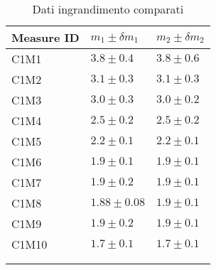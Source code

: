 \begin{longtable}[]{@{}lll@{}}
    \toprule
    Measure ID & $m_1 \pm \delta m_1$ & $m_2 \pm \delta m_2$ \tabularnewline
    \midrule
    \endhead
    C1M1 & $3.8 \pm 0.4$ & $3.8 \pm 0.6$ \tabularnewline
    C1M2 & $3.1 \pm 0.3$ & $3.1 \pm 0.3$ \tabularnewline
    C1M3 & $3.0 \pm 0.3$ & $3.0 \pm 0.2$ \tabularnewline
    C1M4 & $2.5 \pm 0.2$ & $2.5 \pm 0.2$ \tabularnewline
    C1M5 & $2.2 \pm 0.1$ & $2.2 \pm 0.1$ \tabularnewline
    C1M6 & $1.9 \pm 0.1$ & $1.9 \pm 0.1$ \tabularnewline
    C1M7 & $1.9 \pm 0.2$ & $1.9 \pm 0.1$ \tabularnewline
    C1M8 & $1.88\pm 0.08$& $1.9 \pm 0.1$ \tabularnewline
    C1M9 & $1.9 \pm 0.2$ & $1.9 \pm 0.1$ \tabularnewline
    C1M10 & $1.7\pm 0.1$ & $1.7 \pm 0.1$ \tabularnewline
    \bottomrule
    \label{tab:ingrandimento}
    \\
    \caption{Dati ingrandimento comparati}
 \end{longtable}